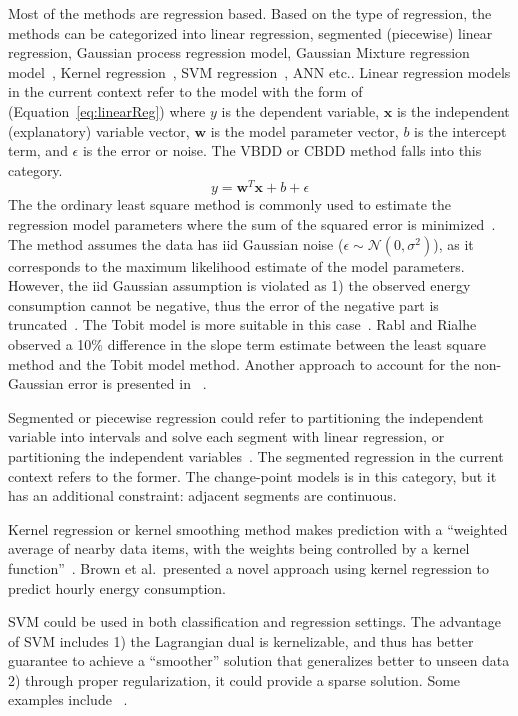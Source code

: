 \documentclass[12pt]{article}
\newcommand{\eref}[1]{Equation~\ref{#1}}
\begin{document}
Most of the methods are regression based. Based on the type of
regression, the methods can be categorized into linear regression,
segmented (piecewise) linear regression, Gaussian process regression
model, Gaussian Mixture regression model~\cite{Zhang2015177}, Kernel
regression~\cite{brown2012kernel}, SVM
regression~\cite{dong2005applying}, ANN etc.. Linear regression models
in the current context refer to the model with the form of
(\eref{eq:linearReg}) where $y$ is the dependent variable,
$\mathbf{x}$ is the independent (explanatory) variable vector,
$\mathbf{w}$ is the model parameter vector, $b$ is the intercept term,
and $\epsilon$ is the error or noise. The VBDD or CBDD method falls
into this category.
\begin{equation}
  \label{eq:linearReg}
  y = \mathbf{w}^T\mathbf{x} + b + \epsilon
\end{equation}
The the ordinary least square method is commonly used to estimate the
regression model parameters where the sum of the squared error is
minimized~\cite{ordinaryLeastSquareWiki2016}. The method assumes the
data has iid Gaussian noise
($\epsilon \sim \mathcal{N}(0, \sigma^2)$), as it corresponds to the
maximum likelihood estimate of the model parameters. However, the iid
Gaussian assumption is violated as 1) the observed energy consumption
cannot be negative, thus the error of the negative part is
truncated~\cite{rabl1992energy}. The Tobit model is more suitable in
this case~\cite{TobitWiki2016}. Rabl and Rialhe observed a 10\%
difference in the slope term estimate between the least square method
and the Tobit model method. Another approach to account for the
non-Gaussian error is presented in ~\cite{huang2003short}.

Segmented or piecewise regression could refer to partitioning the
independent variable into intervals and solve each segment with linear
regression, or partitioning the independent
variables~\cite{segmentRegWiki2016}. The segmented regression in the
current context refers to the former. The change-point models is in
this category, but it has an additional constraint: adjacent segments
are continuous.

Kernel regression or kernel smoothing method makes prediction with a
``weighted average of nearby data items, with the weights being
controlled by a kernel function''~\cite{brown2012kernel}. Brown et
al.\ presented a novel approach using kernel regression to predict
hourly energy consumption.

SVM could be used in both classification and regression settings. The
advantage of SVM includes 1) the Lagrangian dual is kernelizable, and
thus has better guarantee to achieve a ``smoother'' solution that
generalizes better to unseen data 2) through proper regularization, it
could provide a sparse solution. Some examples include
~\cite{dong2005applying, solomon2011forecasting}.
\end{document}
